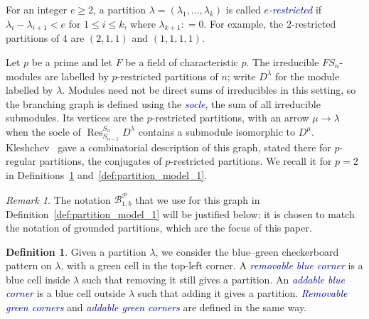 \documentclass[11pt]{article}
\theoremstyle{definition}
\newtheorem{definition}[theorem]{Definition}
\theoremstyle{remark}
\newtheorem{remark}[theorem]{Remark}
\theoremstyle{definition}
\numberwithin{equation}{section}
\newcommand{\coloneq}{\mathrel{\mathop:}=}
\renewcommand\emph[1]{\textcolor{darkblue}{\it #1}}
\begin{document}
For an integer \(e\geq2\), a partition \(\lambda=(\lambda_1,\ldots,\lambda_k)\) is called \emph{\(e\)-restricted} if \(\lambda_i-\lambda_{i+1}<e\) for \(1\leq i\leq k\), where \(\lambda_{k+1}\coloneq0\). For example, the \(2\)-restricted partitions of \(4\) are \((2,1,1)\) and \((1,1,1,1)\).

Let $p$ be a prime and let \(F\) be a field of characteristic \(p\). The irreducible \(F S_n\)-modules are labelled by \(p\)-restricted partitions of \(n\); write \(D^\lambda\) for the module labelled by \(\lambda\). Modules need not be direct sums of irreducibles in this setting, so the branching graph is defined using the \emph{socle}, the sum of all irreducible submodules. Its vertices are the \(p\)-restricted partitions, with an arrow \(\mu\to\lambda\) when the socle of \(\operatorname{Res}^{S_n}_{S_{n-1}}D^\lambda\) contains a submodule isomorphic to \(D^\mu\). Kleshchev~\cite[Theorem~0.5, p.~166]{Kl95} gave a combinatorial description of this graph, stated there for $p$-regular partitions, the conjugates of $p$-restricted partitions. We recall it for \(p=2\) in Definitions~\ref{def:partition_corners} and~\ref{def:partition_model_1}.

\begin{remark}
The notation \( \mathcal{B}_{1,b}^{\mathcal{P}} \) that we use for this graph in Definition~\ref{def:partition_model_1} will be justified below: it is chosen to match the notation of grounded partitions, which are the focus of this paper.
\end{remark}

\begin{definition}\label{def:partition_corners}
Given a partition \(\lambda\), we consider the blue--green
checkerboard pattern on \(\lambda\), with a green cell in the top-left
corner. A \emph{removable blue corner} is a blue cell inside
\( \lambda \) such that removing it still gives a partition. An
\emph{addable blue corner} is a blue cell outside \( \lambda \) such
that adding it gives a partition. \emph{Removable green corners} and
\emph{addable green corners} are defined in the same way.
\end{definition}
\end{document}
